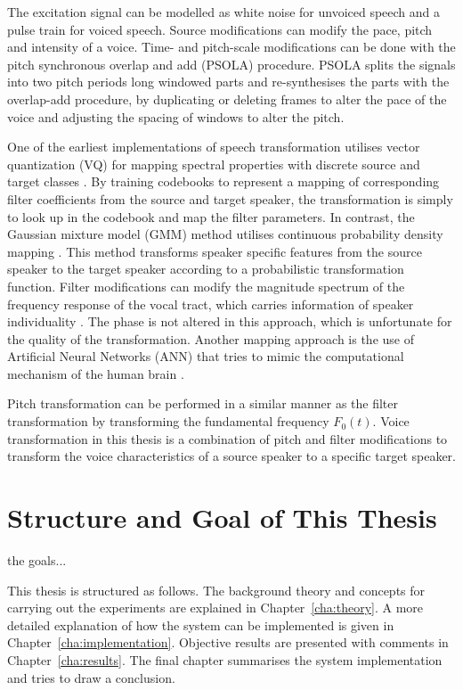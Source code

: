 The excitation signal can be modelled as white noise for unvoiced speech and a pulse train for voiced speech. Source modifications can modify the pace, pitch and intensity of a voice. Time- and pitch-scale modifications can be done with the pitch synchronous overlap and add (PSOLA) procedure. PSOLA splits the signals into two pitch periods long windowed parts and re-synthesises the parts with the overlap-add procedure, by duplicating or deleting frames to alter the pace of the voice and adjusting the spacing of windows to alter the pitch.

One of the earliest implementations of speech transformation utilises vector quantization (VQ) for mapping spectral properties with discrete source and target classes \cite{abe88}. By training codebooks to represent a mapping of corresponding filter coefficients from the source and target speaker, the transformation is simply to look up in the codebook and map the filter parameters. In contrast, the Gaussian mixture model (GMM) method utilises continuous probability density mapping \cite{stylianou98}. This method transforms speaker specific features from the source speaker to the target speaker according to a probabilistic transformation function. Filter modifications can modify the magnitude spectrum of the frequency response of the vocal tract, which carries information of speaker individuality \cite{stylianou09,nguyen09}. The phase is not altered in this approach, which is unfortunate for the quality of the transformation. Another mapping approach is the use of Artificial Neural Networks (ANN) that tries to mimic the computational mechanism of the human brain \cite{desai09,young75}. 

Pitch transformation can be performed in a similar manner as the filter transformation by transforming the fundamental frequency $F_0(t)$. Voice transformation in this thesis is a combination of pitch and filter modifications to transform the voice characteristics of a source speaker to a specific target speaker. 

\section{Structure and Goal of This Thesis} %
\label{sec:structure_and_goal_of_this_thesis}
the goals...

This thesis is structured as follows. The background theory and concepts for carrying out the experiments are explained in Chapter~\ref{cha:theory}. A more detailed explanation of how the system can be implemented is given in Chapter~\ref{cha:implementation}. Objective results are presented with comments in Chapter~\ref{cha:results}. The final chapter summarises the system implementation and tries to draw a conclusion.

